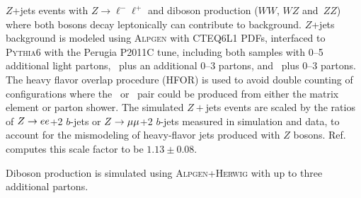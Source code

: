 $Z$+jets events with $Z\rightarrow \ell^-\ell^+$ and diboson production ($WW$, $WZ$ and~$ZZ$) where both bosons decay leptonically can contribute to background. $Z$+jets background is modeled using \textsc{  Alpgen} \cite{Mangano:2002ea} with CTEQ6L1 PDFs, interfaced to \textsc{  Pythia6} with the Perugia P2011C tune, including both samples with 0--5 additional light partons, 
\ccbar\ plus an additional 0--3 partons, and \bbbar\
plus 0--3 partons. The heavy flavor overlap procedure (HFOR) \cite{hfor} is used to avoid double counting of configurations where the \ccbar\ or \bbbar\ pair could be produced from either the matrix element or parton shower. The simulated $Z+$jets  events are scaled by the ratios of $Z\rightarrow ee$+2 $b$-jets or $Z\rightarrow \mu\mu$+2 $b$-jets measured in simulation and data, to account for the mismodeling of heavy-flavor jets produced with $Z$ bosons. Ref.~\cite{xsec} computes this scale factor to be $1.13 \pm 0.08$. 

Diboson production is simulated using \textsc{  Alpgen+Herwig} with up to three additional partons.


